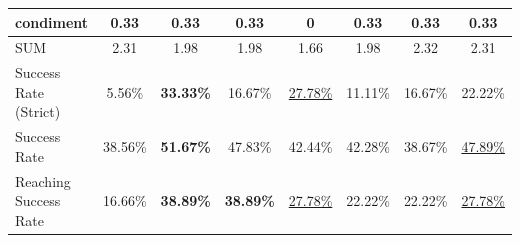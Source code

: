 \documentclass{article} %
\begin{document}
\begin{table}[h!]
{\begin{tabular}{l|cc|ccc|c|c}
condiment & 0.33 & 0.33 & 0.33 & 0 & 0.33 & 0.33 & 0.33 \\
\midrule
SUM & 2.31 & 1.98 & 1.98 & 1.66 & 1.98 & 2.32 & 2.31 \\
\midrule
Success Rate (Strict) & 5.56\% & \textbf{33.33\%} & 16.67\% & \underline{27.78\%} & 11.11\% & 16.67\% & 22.22\% \\
Success Rate & 38.56\% & \textbf{51.67\%} & 47.83\% & 42.44\% & 42.28\% & 38.67\% & \underline{47.89\%} \\
Reaching Success Rate & 16.66\% & \textbf{38.89\%} & \textbf{38.89\%} & \underline{27.78\%} & 22.22\% & 22.22\% & \underline{27.78\%} \\
\bottomrule
\end{tabular}%
}
\label{tab:realresultdetail2}
\end{table}
\end{document}
